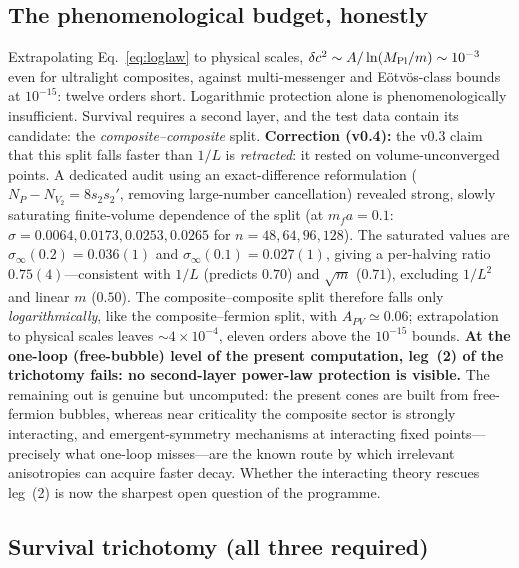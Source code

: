 \documentclass[11pt,a4paper]{article}
\begin{document}
\subsection{The phenomenological budget, honestly}

Extrapolating Eq.~\eqref{eq:loglaw} to physical scales,
$\delta c^2 \sim A/\ln(M_{\rm Pl}/m) \sim 10^{-3}$ even for
ultralight composites, against multi-messenger and
E\"otv\"os-class bounds at $10^{-15}$: twelve orders short.
Logarithmic protection alone is phenomenologically insufficient.
Survival requires a second layer, and the test data contain its
candidate: the \emph{composite--composite} split.
\textbf{Correction (v0.4):} the v0.3 claim that this split falls
faster than $1/L$ is \emph{retracted}: it rested on
volume-unconverged points.  A dedicated audit using an
exact-difference reformulation ($N_P - N_{V_2} = 8 s_2 s_2'$,
removing large-number cancellation) revealed strong, slowly
saturating finite-volume dependence of the split
(at $m_f a = 0.1$: $\sigma = 0.0064, 0.0173, 0.0253, 0.0265$
for $n = 48, 64, 96, 128$).  The saturated values are
$\sigma_\infty(0.2) = 0.036(1)$ and
$\sigma_\infty(0.1) = 0.027(1)$, giving a per-halving ratio
$0.75(4)$---consistent with $1/L$ (predicts $0.70$) and
$\sqrt{m}$ ($0.71$), excluding $1/L^2$ and linear $m$ ($0.50$).
The composite--composite split therefore falls only
\emph{logarithmically}, like the composite--fermion split, with
$A_{PV} \simeq 0.06$; extrapolation to physical scales leaves
$\sim 4\times10^{-4}$, eleven orders above the $10^{-15}$
bounds.  \textbf{At the one-loop (free-bubble) level of the
present computation, leg~(2) of the trichotomy fails: no
second-layer power-law protection is visible.}
The remaining out is genuine but uncomputed: the present cones
are built from free-fermion bubbles, whereas near criticality the
composite sector is strongly interacting, and emergent-symmetry
mechanisms at interacting fixed points---precisely what one-loop
misses---are the known route by which irrelevant anisotropies can
acquire faster decay.  Whether the interacting theory rescues
leg~(2) is now the sharpest open question of the programme.

\subsection{Survival trichotomy (all three required)}
\end{document}
